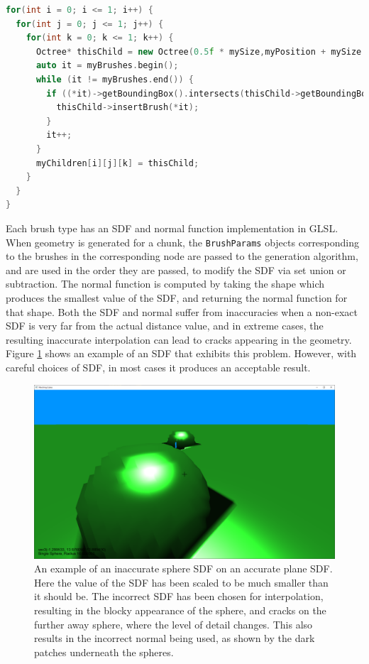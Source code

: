 \documentclass[11pt]{article}
\begin{document}
\begin{lstlisting}[language=C++,label={edit_split},caption={Snippet from \texttt{split}, showing how brushes are added to child nodes, when they are created.}]
for(int i = 0; i <= 1; i++) {
  for(int j = 0; j <= 1; j++) {
    for(int k = 0; k <= 1; k++) {
      Octree* thisChild = new Octree(0.5f * mySize,myPosition + mySize * 0.5f * glm::vec3(i,j,k), myDetailLevel + 1,myGenerator,this,glm::uvec3(i,j,k));
      auto it = myBrushes.begin();
      while (it != myBrushes.end()) {
        if ((*it)->getBoundingBox().intersects(thisChild->getBoundingBox())) {
          thisChild->insertBrush(*it);
        }
        it++;
      }
      myChildren[i][j][k] = thisChild;
    }
  }
}
\end{lstlisting}

Each brush type has an SDF and normal function implementation in GLSL. When geometry is generated for a chunk, the \texttt{BrushParams} objects corresponding to the brushes in the corresponding node are passed to the generation algorithm, and are used in the order they are passed, to modify the SDF via set union or subtraction. The normal function is computed by taking the shape which produces the smallest value of the SDF, and returning the normal function for that shape. Both the SDF and normal suffer from inaccuracies when a non-exact SDF is very far from the actual distance value, and in extreme cases, the resulting inaccurate interpolation can lead to cracks appearing in the geometry. Figure \ref{fig:inaccurate_sdf} shows an example of an SDF that exhibits this problem. However, with careful choices of SDF, in most cases it produces an acceptable result.

\begin{figure}[H]
  \includegraphics[width=\textwidth]{inaccurate_sdf.png}
  \caption{An example of an inaccurate sphere SDF on an accurate plane SDF. Here the value of the SDF has been scaled to be much smaller than it should be. The incorrect SDF has been chosen for interpolation, resulting in the blocky appearance of the sphere, and cracks on the further away sphere, where the level of detail changes. This also results in the incorrect normal being used, as shown by the dark patches underneath the spheres.}
  \label{fig:inaccurate_sdf}
\end{figure}
\end{document}

